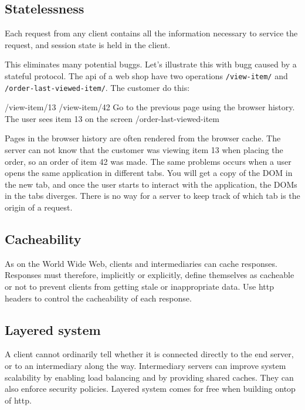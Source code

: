 \subsection{Statelessness}
Each request from any client contains all the information necessary to service the request, and session state is held in the client.

This eliminates many potential buggs. Let's illustrate this with bugg caused by a stateful protocol. The api of a web shop have two operations \texttt{/view-item/} and \texttt{/order-last-viewed-item/}. The customer do this:
\begin{Code}
/view-item/13
/view-item/42
  Go to the previous page using the browser history.
  The user sees item 13 on the screen
/order-last-viewed-item
\end{Code}
Pages in the browser history are often rendered from the browser cache. The server can not know that the customer was viewing item 13 when placing the order, so an order of item 42 was made. The same problems occurs when a user opens the same application in different tabs. You will get a copy of the DOM in the new tab, and once the user starts to interact with the application, the DOMs in the tabs diverges. There is no way for a server to keep track of which tab is the origin of a request.

\subsection{Cacheability}
As on the World Wide Web, clients and intermediaries can cache responses. Responses must therefore, implicitly or explicitly, define themselves as cacheable or not to prevent clients from getting stale or inappropriate data. Use http headers to control the cacheability of each response.

\subsection{Layered system}
A client cannot ordinarily tell whether it is connected directly to the end server, or to an intermediary along the way. Intermediary servers can improve system scalability by enabling load balancing and by providing shared caches. They can also enforce security policies. Layered system comes for free when building ontop of http.

